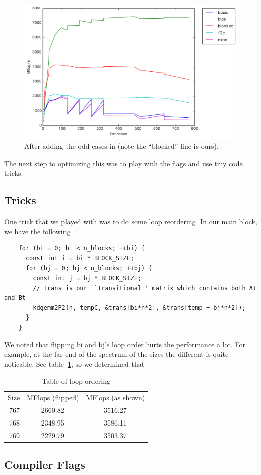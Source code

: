 \documentclass{article}
\begin{document}
  \begin{figure}[h]
    \centering
    \includegraphics[width=.7\textwidth]{odd.pdf}
    \caption{After adding the odd cases in (note the ``blocked'' line is ours).}
    \label{fig:odd}
  \end{figure}

  The next step to optimizing this was to play with the flags and use tiny code tricks.

  \subsection{Tricks}
    One trick that we played with was to do some loop reordering. In our main block, we have the following

    \begin{lstlisting}
    for (bi = 0; bi < n_blocks; ++bi) {
      const int i = bi * BLOCK_SIZE;
      for (bj = 0; bj < n_blocks; ++bj) {
        const int j = bj * BLOCK_SIZE;
        // trans is our ``transitional'' matrix which contains both At and Bt
        kdgemm2P2(n, tempC, &trans[bi*n*2], &trans[temp + bj*n*2]);
      }
    }
    \end{lstlisting}

    We noted that flipping bi and bj's loop order hurts the performance a lot. For example, at the far end of the spectrum of the sizes
    the different is quite noticable. See table~\ref{tab:looporder}, so we determined that 

    \begin{table}
      \centering
      \begin{tabular}{r c c}
        Size & MFlops (flipped) & MFlops (as shown) \\
        767  & 2660.82 & 3516.27\\
        768  & 2348.95 & 3586.11\\
        769  & 2229.79 & 3503.37
      \end{tabular}
      \caption{Table of loop ordering}
      \label{tab:looporder}
    \end{table}

    \subsection{Compiler Flags}
\end{document}
